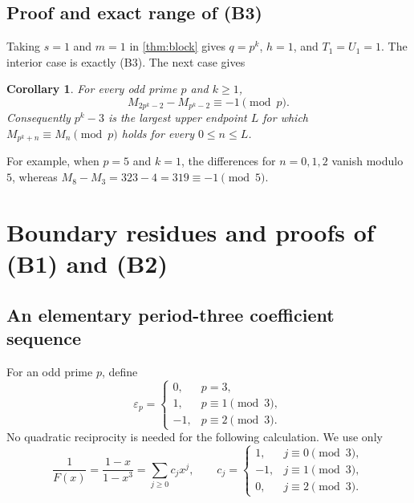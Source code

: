 \documentclass[11pt,a4paper]{article}
\numberwithin{equation}{section}
\newtheorem{corollary}[theorem]{Corollary}
\theoremstyle{definition}
\theoremstyle{remark}
\newcommand{\eps}{\varepsilon}
\begin{document}
\subsection{Proof and exact range of (B3)}
Taking $s=1$ and $m=1$ in \cref{thm:block} gives $q=p^k$, $h=1$, and
$T_1=U_1=1$. The interior case is exactly (B3). The next case gives
\begin{corollary}\label{cor:sharpP}
For every odd prime $p$ and $k\geq1$,
\begin{equation}\label{eq:sharpP}
 M_{2p^k-2}-M_{p^k-2}\equiv-1\pmod p.
\end{equation}
Consequently $p^k-3$ is the largest upper endpoint $L$ for which
$M_{p^k+n}\equiv M_n\pmod p$ holds for every $0\leq n\leq L$.
\end{corollary}
For example, when $p=5$ and $k=1$, the differences for $n=0,1,2$ vanish
modulo $5$, whereas $M_8-M_3=323-4=319\equiv-1\pmod5$.

\section{Boundary residues and proofs of (B1) and (B2)}\label{sec:boundary}

\subsection{An elementary period-three coefficient sequence}
For an odd prime $p$, define
\begin{equation}\label{eq:eps}
 \eps_p=
 \begin{cases}
 0,&p=3,\\
 1,&p\equiv1\pmod3,\\
 -1,&p\equiv2\pmod3.
 \end{cases}
\end{equation}
No quadratic reciprocity is needed for the following calculation.
We use only
\begin{equation}\label{eq:inverseF}
 \frac1{F(x)}=\frac{1-x}{1-x^3}=\sum_{j\geq0}c_jx^j,
 \qquad
 c_j=\begin{cases}1,&j\equiv0\pmod3,\\-1,&j\equiv1\pmod3,\\0,&j\equiv2\pmod3.
 \end{cases}
\end{equation}
\end{document}
